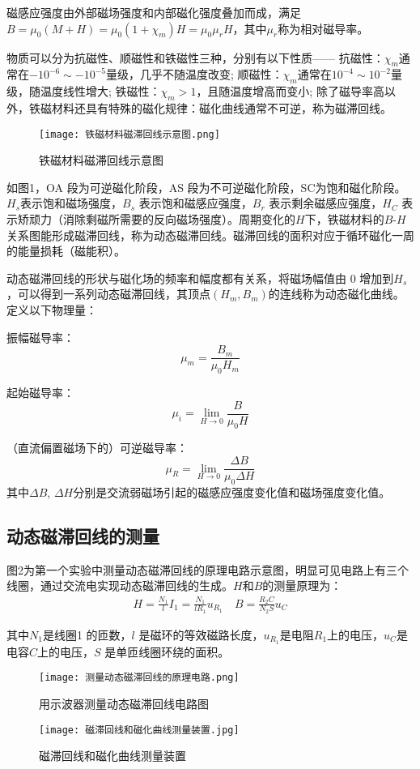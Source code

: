 \documentclass[11pt]{article}
\begin{document}
磁感应强度由外部磁场强度和内部磁化强度叠加而成，满足$B = \mu_0(M + H) = \mu_0(1 + \chi_m)H = \mu_0\mu_rH$，其中$\mu_r$称为相对磁导率。

物质可以分为抗磁性、顺磁性和铁磁性三种，分别有以下性质——
抗磁性：$\chi_m$通常在$-10^{-6}\sim - 10^{-5}$量级，几乎不随温度改变;
顺磁性：$\chi_m$通常在$10^{-4}\sim 10^{-2}$量级，随温度线性增大;
铁磁性：$\chi_m > 1$，且随温度增高而变小;
除了磁导率高以外，铁磁材料还具有特殊的磁化规律：磁化曲线通常不可逆，称为磁滞回线。

\begin{figure}[htbp]
    \centering
    \texttt{[image: 铁磁材料磁滞回线示意图.png]}
    \caption{铁磁材料磁滞回线示意图}
\end{figure}

如图1，OA 段为可逆磁化阶段，AS 段为不可逆磁化阶段，SC为饱和磁化阶段。$H_s$表示饱和磁场强度，$B_s$ 表示饱和磁感应强度，$B_r$ 表示剩余磁感应强度，$H_C$ 表示矫顽力（消除剩磁所需要的反向磁场强度）。周期变化的$H$下，铁磁材料的$B$-$H$关系图能形成磁滞回线，称为动态磁滞回线。磁滞回线的面积对应于循环磁化一周的能量损耗（磁能积）。

动态磁滞回线的形状与磁化场的频率和幅度都有关系，将磁场幅值由 $0$ 增加到$H_s$，可以得到一系列动态磁滞回线，其顶点$(H_m, B_m)$的连线称为动态磁化曲线。定义以下物理量：

振幅磁导率：
\[
    \mu_m = \frac{B_m}{\mu_0H_m}
\]

起始磁导率：
\[
    \mu_i = \lim_{H\rightarrow 0}\frac{B}{\mu_{0}H}
\]

（直流偏置磁场下的）可逆磁导率：
\[
    \mu_R = \lim_{H\rightarrow 0}\frac{\Delta B}{\mu_{0}\Delta H}
\]
其中$\Delta B$, $\Delta H$分别是交流弱磁场引起的磁感应强度变化值和磁场强度变化值。


\subsection{动态磁滞回线的测量}

图2为第一个实验中测量动态磁滞回线的原理电路示意图，明显可见电路上有三个线圈，通过交流电实现动态磁滞回线的生成。$H$和$B$的测量原理为：
\begin{gather*}
    H = \frac{N_1}{l}I_1 = \frac{N_1}{l R_1}u_{R_1}\quad
    B = \frac{R_2 C}{N_2 S}u_C
\end{gather*}

其中$N_1$是线圈1 的匝数，$l$ 是磁环的等效磁路长度，$u_{R_1}$是电阻$R_1$上的电压，$u_{C}$是电容$C$上的电压，$S$ 是单匝线圈环绕的面积。

\begin{figure}[htb]
    \begin{minipage}[t]{0.48\linewidth}
        \centering
        \texttt{[image: 测量动态磁滞回线的原理电路.png]}
        \caption{用示波器测量动态磁滞回线电路图}
    \end{minipage}
    \begin{minipage}[t]{0.51\linewidth}
        \centering
        \texttt{[image: 磁滞回线和磁化曲线测量装置.jpg]}
        \caption{磁滞回线和磁化曲线测量装置}
    \end{minipage}
\end{figure}
\end{document}
